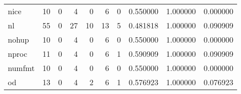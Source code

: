 \begin{longtable}{lrrrrrrrrr}
nice      &                                       10 &                                                  0 &                                                  4 &                                                  0 &                                                  6 &                                                  0 &                                           0.550000 &                               1.000000 &                             0.000000 \\
nl        &                                       55 &                                                  0 &                                                 27 &                                                 10 &                                                 13 &                                                  5 &                                           0.481818 &                               1.000000 &                             0.090909 \\
nohup     &                                       10 &                                                  0 &                                                  4 &                                                  0 &                                                  6 &                                                  0 &                                           0.550000 &                               1.000000 &                             0.000000 \\
nproc     &                                       11 &                                                  0 &                                                  4 &                                                  0 &                                                  6 &                                                  1 &                                           0.590909 &                               1.000000 &                             0.090909 \\
numfmt    &                                       10 &                                                  0 &                                                  4 &                                                  0 &                                                  6 &                                                  0 &                                           0.550000 &                               1.000000 &                             0.000000 \\
od        &                                       13 &                                                  0 &                                                  4 &                                                  2 &                                                  6 &                                                  1 &                                           0.576923 &                               1.000000 &                             0.076923 \\

\end{longtable}
